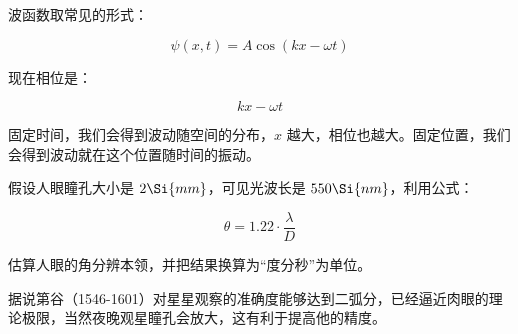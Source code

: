 波函数取常见的形式：

\begin{equation}
\psi (x,t )= A \cos \left( k x - \omega t \right)
\end{equation}

现在相位是：

\begin{equation}
k x - \omega t
\end{equation}

固定时间，我们会得到波动随空间的分布，$x$ 越大，相位也越大。固定位置，我们会得到波动就在这个位置随时间的振动。

\begin{exercise}{}
假设人眼瞳孔大小是 $2\Si{mm}$，可见光波长是 $550\Si{nm}$，利用公式：

\begin{equation}
\theta = 1.22 \cdot \frac{\lambda}{D}
\end{equation}

估算人眼的角分辨本领，并把结果换算为“度分秒”为单位。

据说第谷（1546-1601）对星星观察的准确度能够达到二弧分，已经逼近肉眼的理论极限，当然夜晚观星瞳孔会放大，这有利于提高他的精度。
\end{exercise}
